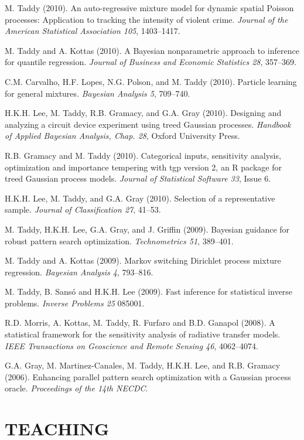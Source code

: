 \documentclass[margin,line]{res}
\begin{document}
\begin{resume}
M. Taddy (2010). An auto-regressive mixture model for dynamic spatial
Poisson processes: Application to tracking the intensity of violent
crime.  {\it Journal of the American Statistical
  Association 105}, 1403--1417.

M.  Taddy and A. Kottas (2010). A Bayesian nonparametric approach to inference for quantile regression.
{\it Journal of Business and Economic Statistics 28}, 357--369.

C.M. Carvalho, H.F. Lopes, N.G. Polson, and M. Taddy
(2010). Particle learning for general mixtures.  {\it Bayesian
  Analysis 5}, 709--740.

H.K.H. Lee, M. Taddy, R.B. Gramacy, and G.A. Gray
(2010). Designing and analyzing a circuit device experiment using
treed Gaussian processes.  {\it Handbook of Applied
  Bayesian Analysis, Chap. 28}, Oxford University Press.

R.B. Gramacy and M. Taddy (2010). Categorical inputs, sensitivity
       analysis, optimization and importance tempering with tgp version 2, an
       R package for treed Gaussian process models. {\it Journal of Statistical Software 33}, Issue 6.


H.K.H. Lee, M. Taddy, and G.A. Gray (2010). Selection of a representative sample.
{\it Journal of Classification 27}, 41--53.

M.  Taddy, H.K.H. Lee, G.A. Gray, and J. Griffin (2009).  Bayesian guidance for robust pattern search optimization.
{\it Technometrics 51}, 389--401.

M. Taddy and A. Kottas (2009).  Markov switching Dirichlet process mixture regression.
{\it Bayesian Analysis 4}, 793--816.

M.  Taddy, B. Sans\'o and H.K.H. Lee (2009). Fast inference for statistical inverse problems.  {\it Inverse Problems 25} 085001.

R.D. Morris, A. Kottas, M. Taddy, R. Furfaro and B.D. Ganapol (2008).
A statistical framework for the sensitivity analysis of radiative transfer models.
{\it IEEE Transactions on Geoscience and Remote Sensing 46}, 4062--4074.

G.A. Gray, M. Martinez-Canales, M. Taddy, H.K.H. Lee, and R.B. Gramacy
(2006). Enhancing parallel pattern search optimization with a Gaussian
process oracle. {\it Proceedings of the 14th NECDC}.



\medskip
\section{\bf TEACHING}


\end{resume}
\end{document}
